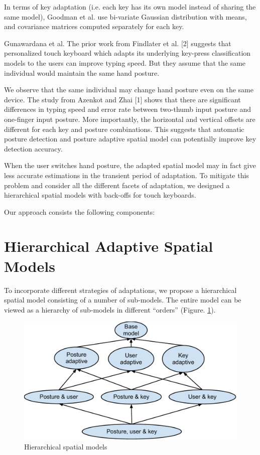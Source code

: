 \documentclass{sigchi}
\begin{document}
In terms of key adaptation (i.e. each key has its own model instead of
sharing the same model), Goodman et al. \cite{Goodman:2002} use bi-variate Gaussian distribution with means, and
covariance matrices computed separately for each key.


Gunawardana et al. 
The prior work from Findlater et al. [2] suggests that personalized touch 
keyboard which adapts its underlying key-press classification models to the 
users can improve typing speed.  But they assume that the same individual would 
maintain the same hand posture. 

We observe that the same individual may change hand posture even on the same device. The study from Azenkot and Zhai [1] shows that there are significant differences in typing speed and error rate between two-thumb input posture and one-finger input posture. More importantly, the horizontal and vertical offsets are different for each key and posture combinations. This suggests that automatic posture detection and posture adaptive spatial model can potentially improve key detection accuracy.

When the user switches hand posture, the adapted spatial model may in fact give less accurate estimations in the transient period of adaptation. To mitigate this problem and consider all the different facets of adaptation, we designed a hierarchical spatial models with back-offs for touch keyboards.  

Our approach consists the following components:

\section{Hierarchical Adaptive Spatial Models}

To incorporate different strategies of adaptations, we propose a hierarchical
spatial model consisting of a number of sub-models.
The entire model can be viewed as a hierarchy of sub-models in different
“orders” (Figure. \ref{fig:hierarchy}).

\begin{figure}[tb]
  \centering
  \includegraphics[width=1\columnwidth]{figures/hierarchical-spatial-model.pdf}
  \caption{Hierarchical spatial models}
  \label{fig:hierarchy}
\end{figure}
\end{document}

